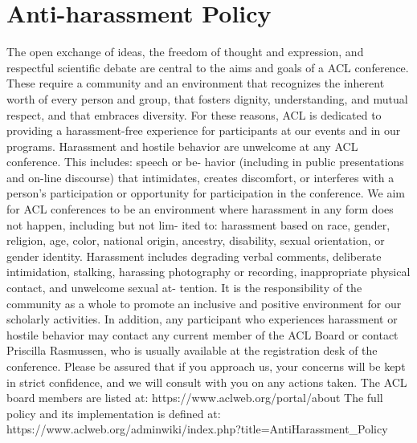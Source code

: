 \chapter{Anti-harassment Policy}
\vspace*{0.2cm}

The open exchange of ideas, the freedom of thought and expression, and respectful scientific debate are central to the aims and goals of a ACL conference. These require a community and an environment that recognizes the inherent worth of every person and group, that fosters dignity, understanding, and mutual respect, and that embraces diversity. For these reasons, ACL is dedicated to providing a harassment-free experience for participants at our events and in our programs.
Harassment and hostile behavior are unwelcome at any ACL conference. This includes: speech or be- havior (including in public presentations and on-line discourse) that intimidates, creates discomfort, or interferes with a person’s participation or opportunity for participation in the conference. We aim for ACL conferences to be an environment where harassment in any form does not happen, including but not lim- ited to: harassment based on race, gender, religion, age, color, national origin, ancestry, disability, sexual orientation, or gender identity. Harassment includes degrading verbal comments, deliberate intimidation, stalking, harassing photography or recording, inappropriate physical contact, and unwelcome sexual at- tention.
It is the responsibility of the community as a whole to promote an inclusive and positive environment for our scholarly activities. In addition, any participant who experiences harassment or hostile behavior may contact any current member of the ACL Board or contact Priscilla Rasmussen, who is usually available at the registration desk of the conference. Please be assured that if you approach us, your concerns will be kept in strict confidence, and we will consult with you on any actions taken.
The ACL board members are listed at:
https://www.aclweb.org/portal/about
The full policy and its implementation is defined at:
https://www.aclweb.org/adminwiki/index.php?title=Anti\-Harassment\_Policy